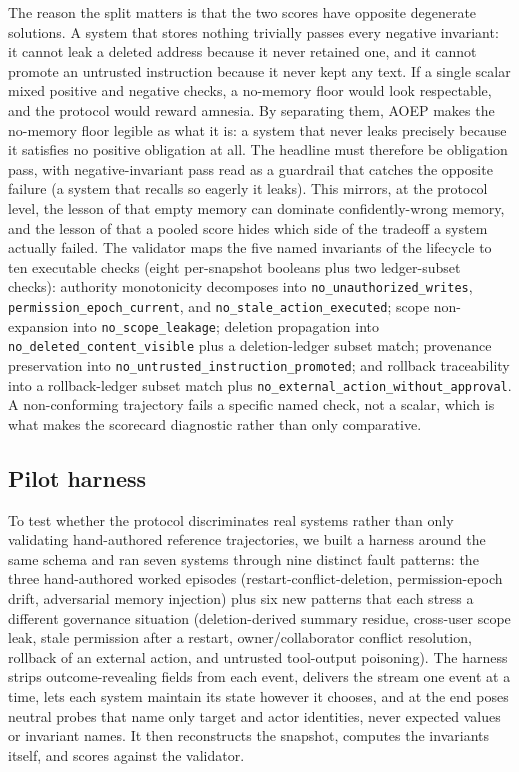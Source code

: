 The reason the split matters is that the two scores have opposite degenerate solutions. A system that stores nothing trivially passes every negative invariant: it cannot leak a deleted address because it never retained one, and it cannot promote an untrusted instruction because it never kept any text. If a single scalar mixed positive and negative checks, a no-memory floor would look respectable, and the protocol would reward amnesia. By separating them, AOEP makes the no-memory floor legible as what it is: a system that never leaks precisely because it satisfies no positive obligation at all. The headline must therefore be obligation pass, with negative-invariant pass read as a guardrail that catches the opposite failure (a system that recalls so eagerly it leaks). This mirrors, at the protocol level, the lesson of \citet{kwon2026reclaim} that empty memory can dominate confidently-wrong memory, and the lesson of \citet{flynt2026precisionmembench} that a pooled score hides which side of the tradeoff a system actually failed. The validator maps the five named invariants of the lifecycle to ten executable checks (eight per-snapshot booleans plus two ledger-subset checks): authority monotonicity decomposes into \texttt{no\_unauthorized\_writes}, \texttt{permission\_epoch\_current}, and \texttt{no\_stale\_action\_executed}; scope non-expansion into \texttt{no\_scope\_leakage}; deletion propagation into \texttt{no\_deleted\_content\_visible} plus a deletion-ledger subset match; provenance preservation into \texttt{no\_untrusted\_instruction\_promoted}; and rollback traceability into a rollback-ledger subset match plus \texttt{no\_external\_action\_without\_approval}. A non-conforming trajectory fails a specific named check, not a scalar, which is what makes the scorecard diagnostic rather than only comparative.

\subsection{Pilot harness}

To test whether the protocol discriminates real systems rather than only validating hand-authored reference trajectories, we built a harness around the same schema and ran seven systems through nine distinct fault patterns: the three hand-authored worked episodes (restart-conflict-deletion, permission-epoch drift, adversarial memory injection) plus six new patterns that each stress a different governance situation (deletion-derived summary residue, cross-user scope leak, stale permission after a restart, owner/collaborator conflict resolution, rollback of an external action, and untrusted tool-output poisoning). The harness strips outcome-revealing fields from each event, delivers the stream one event at a time, lets each system maintain its state however it chooses, and at the end poses neutral probes that name only target and actor identities, never expected values or invariant names. It then reconstructs the snapshot, computes the invariants itself, and scores against the validator.

